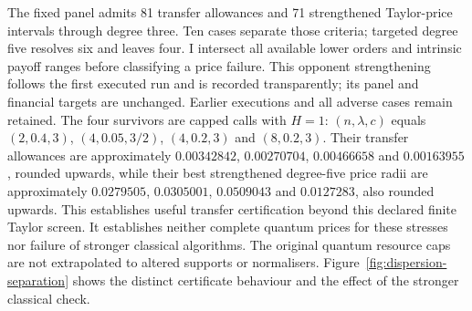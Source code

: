 \documentclass[11pt]{article}
\begin{document}
The fixed panel admits 81 transfer allowances and 71 strengthened
Taylor-price intervals through degree three. Ten cases separate those
criteria; targeted degree five resolves six and leaves four. I intersect
all available lower orders and intrinsic payoff ranges before classifying
a price failure. This opponent strengthening follows the first executed
run and is recorded transparently; its panel and financial targets are
unchanged. Earlier executions and all adverse cases remain retained.
The four survivors are capped calls with $H=1$: $(n,\lambda,c)$ equals
$(2,0.4,3)$, $(4,0.05,3/2)$, $(4,0.2,3)$ and $(8,0.2,3)$.
Their transfer allowances are approximately $0.00342842$, $0.00270704$,
$0.00466658$ and $0.00163955$, rounded upwards, while their best
strengthened degree-five price radii are approximately $0.0279505$,
$0.0305001$, $0.0509043$ and $0.0127283$, also rounded upwards.
This establishes useful transfer certification beyond this declared
finite Taylor screen. It establishes neither complete quantum prices for
these stresses nor failure of stronger classical algorithms. The original
quantum resource caps are not extrapolated to altered supports or
normalisers. Figure~\ref{fig:dispersion-separation} shows the distinct
certificate behaviour and the effect of the stronger classical check.
\end{document}
